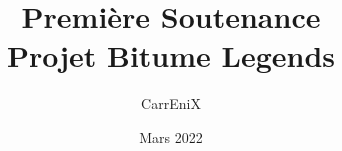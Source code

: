 \documentclass[11pt,a4paper]{article}
\begin{document}
\title{Première Soutenance \\ {\large Projet Bitume Legends}}
\author{CarrEniX}
\date{Mars 2022}
\maketitle


\tableofcontents
\clearpage
\end{document}
